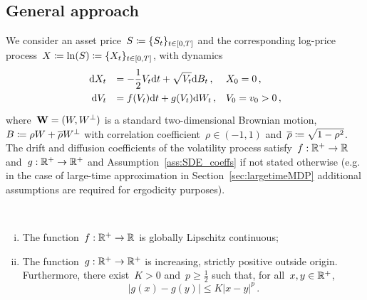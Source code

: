 \subsection{General approach}
We consider an asset price~$S\coloneqq \{S_t\}_{t\in[0,T]}$ and the corresponding log-price process~$X\coloneqq\ln(S) \coloneqq \{X_t\}_{t\in[0,T]}$, with dynamics
\begin{equation}\label{eq:log_price_dyn}
\begin{array}{rll}
\def\arraystretch{1.5}
\D X_t & = \displaystyle -\frac{1}{2}V_t \D t + \sqrt{V_t} \D B_t\,, & X_0 = 0\,, \\
\D V_t & = f(V_t)\D t + g(V_t)\D W_t\,, & V_0 = v_0>0\,,
\end{array}
\end{equation}
where~$\boldsymbol{\mathrm{W}} = (W,W^{\perp})$ is a standard two-dimensional Brownian motion, ${B\coloneqq \rho W + \overline{\rho}W^{\perp}}$ with correlation coefficient~$\rho \in (-1,1)$ and~$\overline{\rho}\coloneqq \sqrt{1-\rho^2}$. The drift and diffusion coefficients of the volatility process satisfy~${f:\mathbb{R}^+\rightarrow\mathbb{R}}$ and~${g:\mathbb{R}^+\rightarrow\mathbb{R}^+}$ and Assumption~\ref{ass:SDE_coeffs} if not stated otherwise (e.g. in the case of large-time approximation in Section~\ref{sec:largetimeMDP} additional assumptions are required for ergodicity purposes). 
\begin{assumption}\label{ass:SDE_coeffs}\
\begin{enumerate}[(i)]
\item The function~$f:\mathbb{R}^+\rightarrow\mathbb{R}$ is globally Lipschitz continuous;
\item The function~$g:\mathbb{R}^+\rightarrow \mathbb{R}^+$ is increasing, strictly positive outside origin.
Furthermore, there exist~$K>0$ and~$p\geq\frac12$ such that, for all~$x,y\in\mathbb{R}^+$,
\[
\left|g(x)-g(y)\right|\leq K |x-y|^p\,.
\]
\end{enumerate}
\end{assumption}
